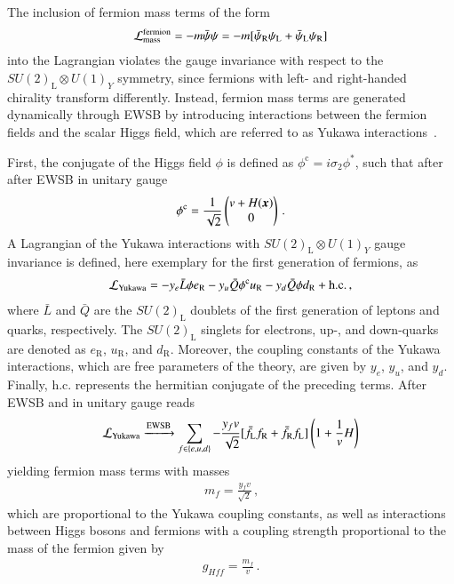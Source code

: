 The inclusion of fermion mass terms of the form
\begin{align*}
  \mathcal{L}_{\text{mass}}^{\text{fermion}} = - m \bar{\psi} \psi = - m [ \bar{\psi}_\text{R} \psi_\text{L} + \bar{\psi}_\text{L} \psi_\text{R} ]
\end{align*}
into the Lagrangian violates the gauge invariance with respect to the
$SU(2)_{\text{L}} \otimes U(1)_Y$ symmetry, since fermions with left- and
right-handed chirality transform differently. Instead, fermion mass terms are
generated dynamically through EWSB by introducing interactions between the
fermion fields and the scalar Higgs field, which are referred to as Yukawa
interactions~\cite{Yukawa:1935xg}.

First, the conjugate of the Higgs field $\phi$ is defined as
$\phi^{\text{c}} = i \sigma_2 \phi^*$, such that after after EWSB in unitary
gauge
\begin{align*}
  \phi^{\text{c}} = \frac{1}{\sqrt{2}}
  \begin{pmatrix}
    v + H(\myvec{x}) \\
    0
  \end{pmatrix} \,\text{.}
\end{align*}
A Lagrangian of the Yukawa interactions with $SU(2)_{\text{L}} \otimes U(1)_Y$
gauge invariance is defined, here exemplary for the first generation of
fermions, as
\begin{align}
  \mathcal{L}_{\text{Yukawa}} =
  - y_e \bar{L} \phi e_{\text{R}}
  - y_u \bar{Q} \phi^{\text{c}} u_{\text{R}}
  - y_d \bar{Q} \phi d_{\text{R}}
  + \text{h.c.} \,\text{,}
  \label{eq:lagrangian_yukawa}
\end{align}
where $\bar{L}$ and $\bar{Q}$ are the $SU(2)_{\text{L}}$ doublets of the first
generation of leptons and quarks, respectively. The $SU(2)_{\text{L}}$ singlets
for electrons, up-, and down-quarks are denoted as $e_{\text{R}}$,
$u_{\text{R}}$, and $d_{\text{R}}$. Moreover, the coupling constants of the
Yukawa interactions, which are free parameters of the theory, are given by
$y_e$, $y_u$, and $y_d$. Finally, $\text{h.c.}$ represents the hermitian
conjugate of the preceding terms. After EWSB and in unitary gauge
 reads
\begin{align*}
  \mathcal{L}_{\text{Yukawa}} \xrightarrow{\text{EWSB}} \sum_{f \in \{e, u, d\}} -\frac{y_f v}{\sqrt{2}} [ \bar{f}_{\text{L}} f_{\text{R}} + \bar{f}_{\text{R}} f_{\text{L}} ] \left( 1 + \frac{1}{v} H \right)
\end{align*}
yielding fermion mass terms with masses
\begin{align*}
  m_f = \frac{y_f v}{\sqrt{2}} \,\text{,}
\end{align*}
which are proportional to the Yukawa coupling constants, as well as interactions
between Higgs bosons and fermions with a coupling strength proportional to the
mass of the fermion given by
\begin{align*}
  g_{Hff} = \frac{m_f}{v} \,\text{.}
\end{align*}

